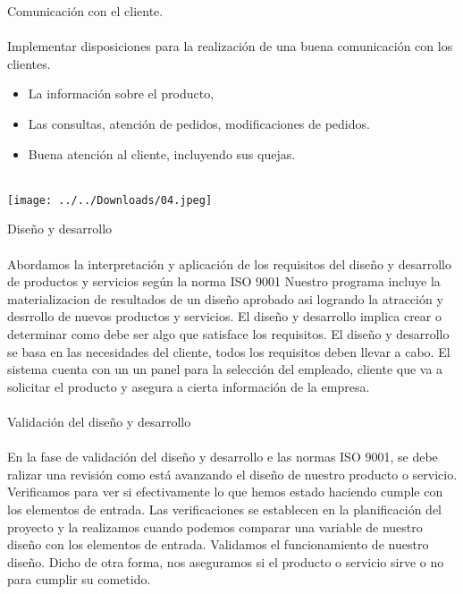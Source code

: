 \documentclass[12pt,a4paper]{article}
\begin{document}
Comunicación con el cliente.\\\\
Implementar disposiciones para la realización de una buena comunicación con  los clientes.
\begin{itemize}
\item La información sobre el producto,
\item Las consultas, atención de pedidos, modificaciones de pedidos.
\item Buena atención al cliente, incluyendo sus quejas.\\\\
\end{itemize}
\begin{center}
\texttt{[image: ../../Downloads/04.jpeg]} 
\end{center}

Diseño y desarrollo\\\\
Abordamos la interpretación y aplicación de los requisitos del diseño y desarrollo de productos y servicios según la norma ISO 9001  
Nuestro programa incluye la materializacion de resultados de un diseño aprobado asi logrando la atracción y desrrollo de nuevos productos y servicios. El diseño y desarrollo implica crear o determinar como debe ser algo que satisface los requisitos. El diseño y desarrollo se basa en las necesidades del cliente, todos los requisitos deben llevar a cabo. El sistema cuenta con un un panel para la selección del empleado, cliente que va a solicitar el producto y asegura a cierta información de la empresa.\\\\
Validación del diseño y desarrollo\\\\
En la fase de validación del diseño y desarrollo e las normas ISO 9001, se  debe ralizar una revisión como está avanzando el diseño de nuestro producto o servicio. Verificamos para ver si efectivamente lo que hemos estado haciendo cumple con los elementos de entrada. Las verificaciones se establecen en la planificación del proyecto y la realizamos cuando podemos comparar una variable de nuestro diseño con los elementos de entrada. Validamos el funcionamiento de nuestro diseño. Dicho de otra forma, nos aseguramos si el producto o servicio sirve o no para cumplir su cometido.
\end{document}
